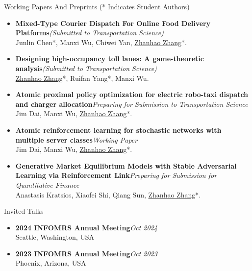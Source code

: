 \documentclass{resume} %
\begin{document}
\begin{rSection}{Working Papers And Preprints ({* Indicates Student Authors})}
\begin{itemize}
\item {\bf Mixed-Type Courier Dispatch For Online Food Delivery Platforms}\hfill {\em (Submitted to Transportation Science)}\\
Junlin Chen*, Manxi Wu, Chiwei Yan, \underline{Zhanhao Zhang}*.
\item {\bf Designing high-occupancy toll lanes: A game-theoretic analysis}\hfill {\em (Submitted to Transportation Science)}\\
\underline{Zhanhao Zhang}*, Ruifan Yang*, Manxi Wu.
\item {\bf Atomic proximal policy optimization for electric robo-taxi dispatch and charger allocation}\hfill {\em Preparing for Submission to Transportation Science}\\
Jim Dai, Manxi Wu, \underline{Zhanhao Zhang}*.
\item {\bf Atomic reinforcement learning for stochastic networks with multiple server classes}\hfill {\em Working Paper}\\
Jim Dai, Manxi Wu, \underline{Zhanhao Zhang}*.
\item {\bf Generative Market Equilibrium Models with Stable Adversarial Learning via Reinforcement Link}\hfill {\em Preparing for Submission for Quantitative Finance}\\
Anastasis Kratsios, Xiaofei Shi, Qiang Sun, \underline{Zhanhao Zhang}*.
\end{itemize}
\end{rSection}


\begin{rSection}{Invited Talks}
\begin{itemize}
\item {\bf 2024 INFOMRS Annual Meeting}\hfill {\em Oct 2024}\\
Seattle, Washington, USA
\item {\bf 2023 INFOMRS Annual Meeting}\hfill {\em Oct 2023}\\
Phoenix, Arizona, USA
\end{itemize}
\end{rSection}
\end{document}
